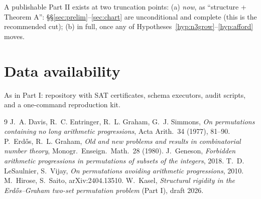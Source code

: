 \documentclass[11pt]{article}
\theoremstyle{definition}
\begin{document}
A publishable Part II exists at two truncation points: (a) \emph{now}, as
``structure + Theorem A'': \S\S\ref{sec:prelim}--\ref{sec:chart} are
unconditional and complete (this is the recommended cut); (b) in full, once
any of Hypotheses~\ref{hyp:n3grow}--\ref{hyp:afford} moves.

\section*{Data availability}
As in Part I: repository with SAT certificates, schema executors, audit
scripts, and a one-command reproduction kit.

\begin{thebibliography}{9}
 J.~A. Davis, R.~C. Entringer, R.~L. Graham,
G.~J. Simmons, \emph{On permutations containing no long arithmetic
progressions}, Acta Arith.\ 34 (1977), 81--90.
 P.~Erd\H{o}s, R.~L. Graham, \emph{Old and new problems and
results in combinatorial number theory}, Monogr.\ Enseign.\ Math.\ 28
(1980).
 J.~Geneson, \emph{Forbidden arithmetic progressions in
permutations of subsets of the integers}, 2018.
 T.~D. LeSaulnier, S.~Vijay, \emph{On permutations avoiding
arithmetic progressions}, 2010.
 M.~Hirose, S.~Saito, arXiv:2404.13510.
 W.~Kasel, \emph{Structural rigidity in the
Erd\H{o}s--Graham two-set permutation problem} (Part I), draft 2026.
\end{thebibliography}
\end{document}

